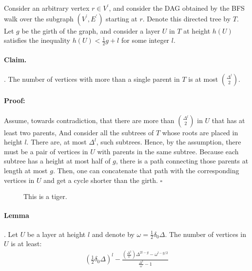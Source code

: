 \documentclass{article}
\begin{document}
\begin{multicols*}{2}
Consider an arbitrary vertex $r \in V^\prime$, and consider the DAG obtained by the BFS walk over the subgraph $\left(V^\prime, E^\prime \right)$ starting at $r$. Denote this directed tree by $T$.
Let $g$ be the girth of the graph, and consider a layer $U$ in $T$ at height $h\left( U \right)$ satisfies the inequality $ h\left( U \right) < \frac{1}{2}g + l$ for some integer $l$.
\paragraph{Claim.}. The number of vertices with more than a single parent in $T$ is at most ${\Delta^l}\choose{2}$.  
\paragraph{Proof:}Assume, towards contradiction, that there are more than $ \Delta^l \choose 2 $ in $U$ that has at least two parents, And consider all the subtrees of $T$ whose roots are placed in height $l$. There are, at most $\Delta^l$, such subtrees. Hence, by the assumption, there must be a pair of vertices in $U$ with parents in the same subtree. Because each subtree has a height at most half of $g$, there is a path connecting those parents at length at most $g$. Then, one can concatenate that path with the corresponding vertices in $U$ and get a cycle shorter than the girth. $\square$
\begin{figure*}[t]

\caption{This is a tiger.}
\end{figure*}
\paragraph{Lemma}. Let $U$ be a layer at height $l$ and denote by $ \omega = \frac{1}{2}\delta_{0}\Delta$. The number of vertices in $U$ is at least: 
\begin{equation*}
  \begin{split}
    \left( \frac{1}{2}\delta_0\Delta \right)^{l}- \frac{\left( \frac{\Delta^{2}}{\omega} \right)\Delta^{2l-g} - \omega^{l-g/2} }{\frac{\Delta^{2}}{\omega}-1}
  \end{split}
\end{equation*}


\end{multicols*}
\end{document}
